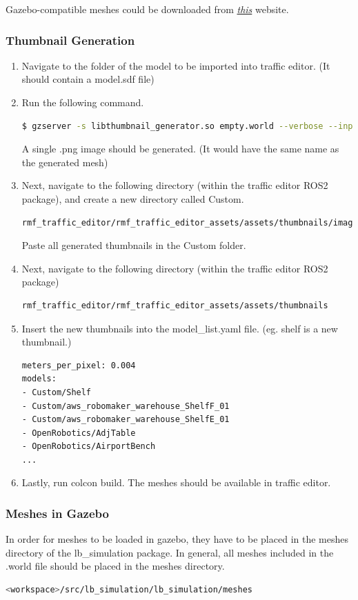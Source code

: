 \documentclass[11pt]{article}
\begin{document}
Gazebo-compatible meshes could be downloaded from \href{https://app.gazebosim.org/dashboard}{\emph{this}} website.
\subsubsection{Thumbnail Generation}
\begin{enumerate}
 \item {
       Navigate to the folder of the model to be imported into traffic editor. (It should contain a model.sdf file)
       }
 \item {
       Run the following command.
       \begin{lstlisting}[language=bash]
         $ gzserver -s libthumbnail_generator.so empty.world --verbose --input <model filepath>/model.sdf --output .
        \end{lstlisting}
       A single .png image should be generated. (It would have the same name as the generated mesh)
       }
 \item {
       Next, navigate to the following directory (within the traffic editor ROS2 package), and create a new directory called Custom.
       \begin{lstlisting}[language=bash]
rmf_traffic_editor/rmf_traffic_editor_assets/assets/thumbnails/images/cropped
        \end{lstlisting}
       }
       Paste all generated thumbnails in the Custom folder.
 \item  {
       Next, navigate to the following directory (within the traffic editor ROS2 package)
       \begin{lstlisting}[language=bash]
rmf_traffic_editor/rmf_traffic_editor_assets/assets/thumbnails
        \end{lstlisting}
       }
 \item {
       Insert the new thumbnails into the model\_list.yaml file. (eg. shelf is a new thumbnail.)
       \begin{lstlisting}[language=bash]
  meters_per_pixel: 0.004
models:
- Custom/Shelf
- Custom/aws_robomaker_warehouse_ShelfF_01
- Custom/aws_robomaker_warehouse_ShelfE_01
- OpenRobotics/AdjTable
- OpenRobotics/AirportBench
...
  \end{lstlisting}
       }
 \item {
       Lastly, run colcon build. The meshes should be available in traffic editor.
       }
\end{enumerate}
\subsubsection{Meshes in Gazebo}
In order for meshes to be loaded in gazebo, they have to be placed in the meshes directory
of the lb\_simulation package. In general, all meshes included in the .world file should be placed in the meshes directory.
\begin{lstlisting}[language=bash]
<workspace>/src/lb_simulation/lb_simulation/meshes
\end{lstlisting}
\end{document}
